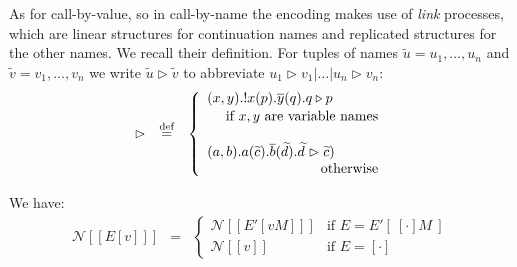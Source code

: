 \documentclass[11pt,a4paper]{amsart}
\theoremstyle{plain}
\theoremstyle{definition}
\theoremstyle{defC}
\theoremstyle{thmC}
\theoremstyle{plain}
\numberwithin{equation}{section}
\def\inp#1#2{#1(#2)}
\def\bout#1#2{\overline{#1}(#2)}   %
\def\abs#1{(#1). }                    %
\def\abs#1#2{(#1). #2}                    %
\newcommand{\contexthole}{ [ \cdot  ] }      %
\def\defi{\stackrel{\mbox{\scriptsize {\rm{def}}}}{=}} %
\newcommand{\til}[1]{\widetilde{#1}}
\newcommand{\encoN}[1]{{\mathcal {N}} [\! [ #1 ] \! ]  }
\newcommand{\link}[2]{ #1 \vartriangleright #2} %
\newcommand{\fwdsymb}{\triangleright}
\newcommand{\fwd}[2]{#1\fwdsymb #2}
\newcommand{\mypt}{12pt}
\newcommand{\myptSmall}{1pt}
\newcommand{\Intp}{\mbox{I$\pi$}\xspace}   %
\newcommand{\piI}{\Intp}   %
\theoremstyle{plain}
\theoremstyle{definition}
\begin{document}
As for call-by-value, so in call-by-name the encoding makes use of 
 \emph{link} processes, which are linear structures for continuation
 names and replicated structures for the other names.  We recall their
 definition. 
For tuples of names 
 $\til u = u_1, \ldots , u_n$
 and
$\til v =  v_1, \ldots , v_n$   
we write $\link{\til u}{\til v}$
to 
  abbreviate 
   $\link{u_1}{v_1} | \ldots |  \link{u_n}{v_n}$:
$$
\begin{array}{rcl}
\link{}{} &\defi &
\left\{ \begin{array}{l}
 \abs{x,y} ! \inp x {p}.\bout {y} {q}
           . {\fwd{ q}{ p}}\\[\myptSmall] 
 \multicolumn{1}{l}{  
        ~\quad  \mbox{if $x,y$ are variable names}
                   }              \\[\mypt]
\abs{a,b}   \inp a { \til c }.\bout b {\til d}
          .{\link{ \til d}{ \til c}})  \\
\multicolumn{1}{r}{  
          ~\quad \mbox{otherwise}
}\end{array} \right. 
\end{array}
 $$


\noindent
We have:
\[ 
\begin{array}{rcl}
\encoN {E [v ]} & = & 
\left\{ \begin{array}{ll}
\encoN {E' [vM ]}  & 
\mbox{if $E =
E'[\:  \contexthole M   \: ] %
$}
\\[\mypt]
\encoN {v}  & 
\mbox{if $E = \contexthole$}
\end{array} \right. 
\end{array} 
\]
\end{document}
